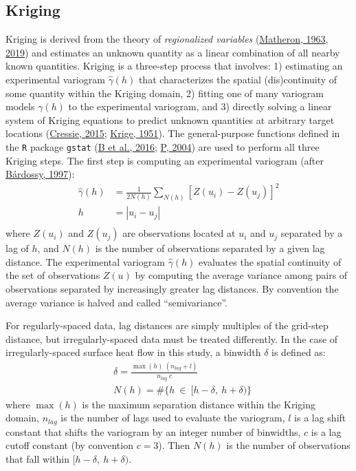\hypertarget{kriging}{%
\subsection{Kriging}\label{kriging}}

Kriging is derived from the theory of \emph{regionalized variables} (\protect\hyperlink{ref-matheron1963}{Matheron, 1963}, \protect\hyperlink{ref-matheron2019}{2019}) and estimates an unknown quantity as a linear combination of all nearby known quantities. Kriging is a three-step process that involves: 1) estimating an experimental variogram \(\hat{\gamma}(h)\) that characterizes the spatial (dis)continuity of some quantity within the Kriging domain, 2) fitting one of many variogram models \(\gamma(h)\) to the experimental variogram, and 3) directly solving a linear system of Kriging equations to predict unknown quantities at arbitrary target locations (\protect\hyperlink{ref-cressie2015}{Cressie, 2015}; \protect\hyperlink{ref-krige1951}{Krige, 1951}). The general-purpose functions defined in the \texttt{R} package \texttt{gstat} (\protect\hyperlink{ref-graler2016}{B et al., 2016}; \protect\hyperlink{ref-pebesma2004}{P, 2004}) are used to perform all three Kriging steps. The first step is computing an experimental variogram (after \protect\hyperlink{ref-bardossy1997}{Bárdossy, 1997}):
\begin{equation}
  \begin{aligned}
    \hat{\gamma}(h) &= \frac{1}{2N(h)}\sum_{N(h)}^{}[Z(u_i) - Z(u_j)]^2 \\
    h &= |u_i - u_j| \\
  \end{aligned}
  \label{eq:variogram}
\end{equation}
where \(Z(u_i)\) and \(Z(u_j)\) are observations located at \(u_i\) and \(u_j\) separated by a lag of \(h\), and \(N(h)\) is the number of observations separated by a given lag distance. The experimental variogram \(\hat{\gamma}(h)\) evaluates the spatial continuity of the set of observations \(Z(u)\) by computing the average variance among pairs of observations separated by increasingly greater lag distances. By convention the average variance is halved and called ``semivariance''.

For regularly-spaced data, lag distances are simply multiples of the grid-step distance, but irregularly-spaced data must be treated differently. In the case of irregularly-spaced surface heat flow in this study, a binwidth \(\delta\) is defined as:
\begin{equation}
  \begin{aligned}
    &\delta = \frac{\max(h)\ (n_{lag}+l)}{n_{lag}\ c} \\
    &N(h) = \#\{h \  \in \  [h - \delta,\  h + \delta)\}
  \end{aligned}
  \label{eq:binwidth}
\end{equation}
where \(\max(h)\) is the maximum separation distance within the Kriging domain, \(n_{lag}\) is the number of lags used to evaluate the variogram, \(l\) is a lag shift constant that shifts the variogram by an integer number of binwidths, \(c\) is a lag cutoff constant (by convention \(c=3\)). Then \(N(h)\) is the number of observations that fall within \([h-\delta,\ h+\delta)\).

